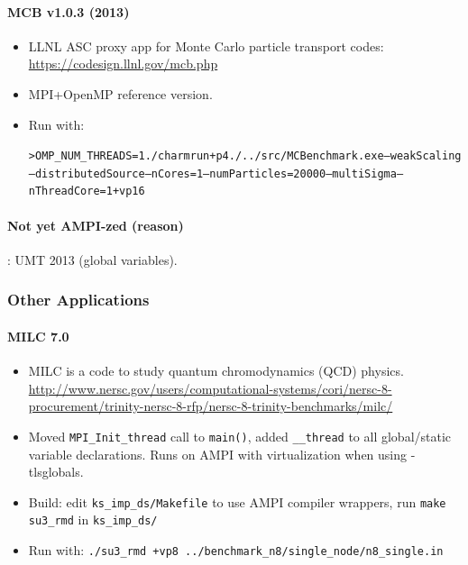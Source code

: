 \documentclass[10pt]{article}
\begin{document}
\paragraph{MCB v1.0.3 (2013)}
    \begin{itemize}
    \item
      LLNL ASC proxy app for Monte Carlo particle transport
      codes: \url{https://codesign.llnl.gov/mcb.php}
    \item
      MPI+OpenMP reference version.
    \item
      Run with:
\begin{alltt}
> OMP_NUM_THREADS=1 ./charmrun +p4 ./../src/MCBenchmark.exe --weakScaling
 --distributedSource --nCores=1 --numParticles=20000 --multiSigma --nThreadCore=1 +vp16
\end{alltt}

  \end{itemize}

\paragraph{Not yet AMPI-zed (reason)}: UMT 2013 (global variables).

\subsubsection{Other Applications}

\paragraph{MILC 7.0}
    \begin{itemize}
    \item
      MILC is a code to
      study quantum chromodynamics (QCD) physics. \url{http://www.nersc.gov/users/computational-systems/cori/nersc-8-procurement/trinity-nersc-8-rfp/nersc-8-trinity-benchmarks/milc/}
    \item
      Moved \texttt{MPI\_Init\_thread} call to \texttt{main()}, added \texttt{\_\_thread} to all
      global/static variable declarations. Runs on AMPI with
      virtualization when using -tlsglobals.
    \item
      Build: edit \texttt{ks\_imp\_ds/Makefile} to use AMPI compiler wrappers,
      run \texttt{make su3\_rmd} in \texttt{ks\_imp\_ds/}
    \item
      Run with: \texttt{./su3\_rmd +vp8
      ../benchmark\_n8/single\_node/n8\_single.in}
    \end{itemize}
\end{document}

